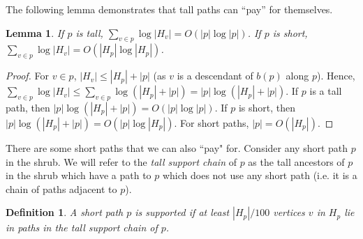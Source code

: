 \documentclass[11pt]{article}
\newcommand{\ignore}[1]{}
\newtheorem{lemma}[theorem]{Lemma}
\newtheorem{definition}[theorem]{Definition}
\theoremstyle{definition}
\newcommand{\Sec}[1]{\hyperref[sec:#1]{\S\ref*{sec:#1}}} %
\newcommand{\Obs}[1]{\hyperref[obs:#1]{Observation~\ref*{obs:#1}}} %
\begin{document}
The following lemma demonstrates that tall paths can ``pay'' for themselves.

\begin{lemma}
\label{lem:pathBounds} If $p$ is tall, $\sum_{v\in p} \log |H_v| = O(|p| \log |p|)$.
If $p$ is short, $\sum_{v\in p} \log |H_v| = O(|H_p| \log |H_p|)$.
\end{lemma}
\begin{proof} \ignore{
 By $\Obs{decrease}$ we know that for any vertex $v\in p$, $|H_v|\leq |H_{p}| + |p|$ (as $v$ is a descendant of $r_p$ along $p$).
}
For $v \in p$, $|H_v|\leq |H_{p}| + |p|$ (as $v$ is a descendant of $b(p)$ along $p$).
Hence, $\sum_{v\in p} \log |H_v| \leq \sum_{v\in p} \log(|H_{p}| + |p|)  = |p| \log (|H_{p}| + |p|)$.
 If $p$ is a tall path, then $|p| \log (|H_{p}| + |p|) = O(|p| \log |p|)$. If $p$ is short, then 
 $|p| \log (|H_{p}| + |p|) = O(|p| \log |H_{p}| )$. For short paths, $|p| = O(|H_p|)$.
\end{proof}

\ignore{
For a short path $p$ we can think of the quantity $|p|(\log |H_p| - \log |p|)$ as the excess of $p$, i.e. what was not ``paid for'' locally by $p$.
Our eventual goal will be to show that by choosing the right path decomposition, this excess 
can be recharged to tall paths. In the next couple sections we introduce the appropriate path decomposition and prove 
some useful facts about it.  Then given these facts, in \Sec{} we are able to make the recharging argument.
}

There are some short paths that we can also ``pay" for.  Consider any short path $p$ in the shrub.  We will refer to the 
\emph{tall support chain} of $p$ as the tall ancestors of $p$ in the shrub which have a path to $p$ which does not use any 
short path (i.e. it is a chain of paths adjacent to $p$).

\begin{definition} \label{def:support} A short path $p$ is \emph{supported} if
at least $|H_p|/100$ vertices $v$ in $H_p$ lie in paths in the tall support chain of $p$.
%
%
\end{definition}
\end{document}
